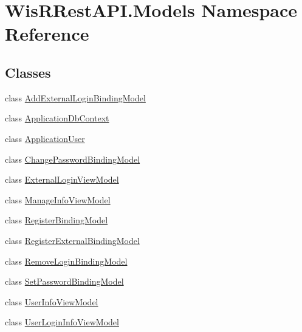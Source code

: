 \hypertarget{namespace_wis_r_rest_a_p_i_1_1_models}{}\section{Wis\+R\+Rest\+A\+P\+I.\+Models Namespace Reference}
\label{namespace_wis_r_rest_a_p_i_1_1_models}
\subsection*{Classes}
\begin{DoxyCompactItemize}
\item 
class \hyperlink{class_wis_r_rest_a_p_i_1_1_models_1_1_add_external_login_binding_model}{Add\+External\+Login\+Binding\+Model}
\item 
class \hyperlink{class_wis_r_rest_a_p_i_1_1_models_1_1_application_db_context}{Application\+Db\+Context}
\item 
class \hyperlink{class_wis_r_rest_a_p_i_1_1_models_1_1_application_user}{Application\+User}
\item 
class \hyperlink{class_wis_r_rest_a_p_i_1_1_models_1_1_change_password_binding_model}{Change\+Password\+Binding\+Model}
\item 
class \hyperlink{class_wis_r_rest_a_p_i_1_1_models_1_1_external_login_view_model}{External\+Login\+View\+Model}
\item 
class \hyperlink{class_wis_r_rest_a_p_i_1_1_models_1_1_manage_info_view_model}{Manage\+Info\+View\+Model}
\item 
class \hyperlink{class_wis_r_rest_a_p_i_1_1_models_1_1_register_binding_model}{Register\+Binding\+Model}
\item 
class \hyperlink{class_wis_r_rest_a_p_i_1_1_models_1_1_register_external_binding_model}{Register\+External\+Binding\+Model}
\item 
class \hyperlink{class_wis_r_rest_a_p_i_1_1_models_1_1_remove_login_binding_model}{Remove\+Login\+Binding\+Model}
\item 
class \hyperlink{class_wis_r_rest_a_p_i_1_1_models_1_1_set_password_binding_model}{Set\+Password\+Binding\+Model}
\item 
class \hyperlink{class_wis_r_rest_a_p_i_1_1_models_1_1_user_info_view_model}{User\+Info\+View\+Model}
\item 
class \hyperlink{class_wis_r_rest_a_p_i_1_1_models_1_1_user_login_info_view_model}{User\+Login\+Info\+View\+Model}
\end{DoxyCompactItemize}
